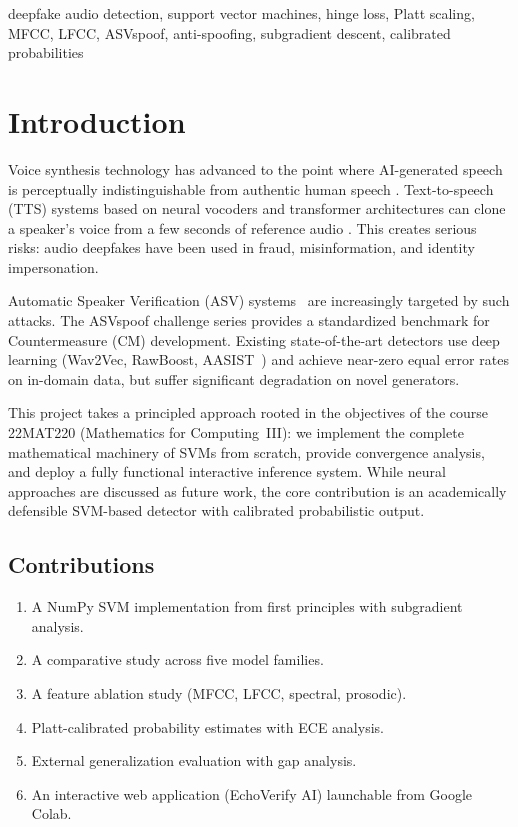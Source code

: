 \documentclass[conference]{IEEEtran}
\begin{document}
\begin{IEEEkeywords}
deepfake audio detection, support vector machines, hinge loss, Platt scaling,
MFCC, LFCC, ASVspoof, anti-spoofing, subgradient descent, calibrated probabilities
\end{IEEEkeywords}

\section{Introduction}
\label{sec:intro}

Voice synthesis technology has advanced to the point where AI-generated speech is
perceptually indistinguishable from authentic human speech \cite{wavenet2016, tacotron2017}.
Text-to-speech (TTS) systems based on neural vocoders and transformer architectures
can clone a speaker's voice from a few seconds of reference audio \cite{valle2023}.
This creates serious risks: audio deepfakes have been used in fraud, misinformation,
and identity impersonation.

Automatic Speaker Verification (ASV) systems~\cite{asvspoof2019} are increasingly
targeted by such attacks. The ASVspoof challenge series provides a standardized
benchmark for Countermeasure (CM) development. Existing state-of-the-art detectors
use deep learning (Wav2Vec, RawBoost, AASIST~\cite{jung2022aasist}) and achieve near-zero
equal error rates on in-domain data, but suffer significant degradation on novel generators.

This project takes a principled approach rooted in the objectives of the course
22MAT220 (Mathematics for Computing~III): we implement the complete mathematical
machinery of SVMs from scratch, provide convergence analysis, and deploy a fully
functional interactive inference system. While neural approaches are discussed as
future work, the core contribution is an academically defensible SVM-based detector
with calibrated probabilistic output.

\subsection{Contributions}
\begin{enumerate}
  \item A NumPy SVM implementation from first principles with subgradient analysis.
  \item A comparative study across five model families.
  \item A feature ablation study (MFCC, LFCC, spectral, prosodic).
  \item Platt-calibrated probability estimates with ECE analysis.
  \item External generalization evaluation with gap analysis.
  \item An interactive web application (EchoVerify AI) launchable from Google Colab.
\end{enumerate}
\end{document}
